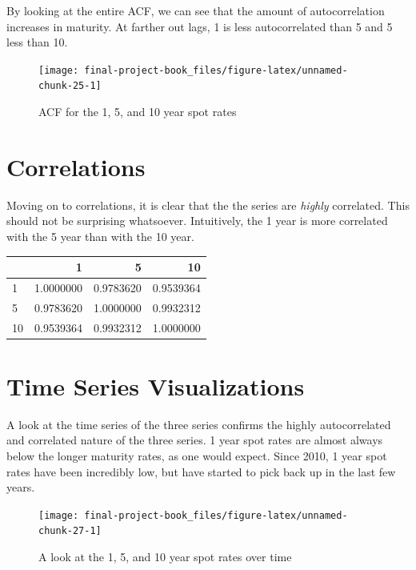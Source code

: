\documentclass[]{book}
\theoremstyle{definition}
\theoremstyle{definition}
\theoremstyle{definition}
\theoremstyle{remark}
\begin{document}
By looking at the entire ACF, we can see that the amount of
autocorrelation increases in maturity. At farther out lags, 1 is less
autocorrelated than 5 and 5 less than 10.

\begin{figure}

{\centering \texttt{[image: final-project-book\_files/figure-latex/unnamed-chunk-25-1]} 

}

\caption{ACF for the 1, 5, and 10 year spot rates}\label{fig:unnamed-chunk-25}
\end{figure}

\hypertarget{correlations}{%
\section{Correlations}\label{correlations}}

Moving on to correlations, it is clear that the the series are
\emph{highly} correlated. This should not be surprising whatsoever.
Intuitively, the 1 year is more correlated with the 5 year than with the
10 year.

\begin{tabular}{l|r|r|r}
\hline
  & 1 & 5 & 10\\
\hline
1 & 1.0000000 & 0.9783620 & 0.9539364\\
\hline
5 & 0.9783620 & 1.0000000 & 0.9932312\\
\hline
10 & 0.9539364 & 0.9932312 & 1.0000000\\
\hline
\end{tabular}

\hypertarget{time-series-visualizations}{%
\section{Time Series Visualizations}\label{time-series-visualizations}}

A look at the time series of the three series confirms the highly
autocorrelated and correlated nature of the three series. 1 year spot
rates are almost always below the longer maturity rates, as one would
expect. Since 2010, 1 year spot rates have been incredibly low, but have
started to pick back up in the last few years.

\begin{figure}

{\centering \texttt{[image: final-project-book\_files/figure-latex/unnamed-chunk-27-1]} 

}

\caption{A look at the 1, 5, and 10 year spot rates over time}\label{fig:unnamed-chunk-27}
\end{figure}
\end{document}
